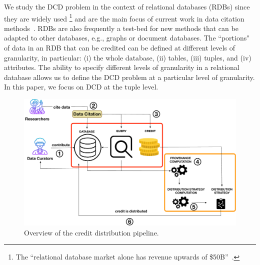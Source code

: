 

We study the DCD problem in the context of 
relational databases (RDBs) since they are widely used \footnote{The ``relational database
market alone has revenue upwards of \$50B''~\citep{AbadiEtAl2020}. } and are the main focus of current work in data citation methods~\citep{buneman2010rule,bunemann2016citation,ProllR13}.  
RDBs are also frequently a test-bed for new methods that can be adapted to other databases, e.g., graphs or document databases.
The ``portions" of data in an RDB that can be credited can be defined at different levels of granularity, in particular: (i) the whole database, (ii)  tables, (iii) tuples, and (iv) attributes. 
\textcolor{correction}{The ability to specify different levels of granularity in a relational database allows us to define the DCD problem at a particular level of granularity. In this paper, we focus on DCD at the tuple level.}



\begin{figure}[]
    \centering
    \includegraphics[width=.85\textwidth]{./figures/overview}
    \caption{Overview of the credit distribution pipeline.}
\label{fig:system_overview}
\end{figure}


